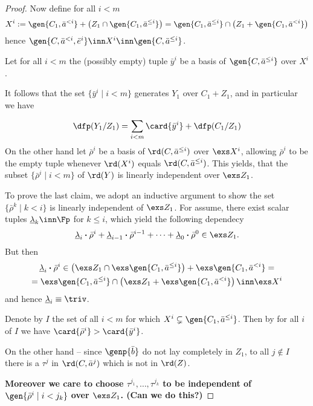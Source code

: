 \documentclass[11pt,english]{article}
\begin{document}
\begin{proof}
Now define for all $i<m$
$$X^{i}:=\gen{C_{1},\bar a^{<i}}+\left(Z_{1}\cap\gen{C_{1},\bar a^{\leq i}}\right)=\gen{C_{1},\bar a^{\leq i}}\cap\left( Z_{1}+\gen{C_{1},\bar a^{<i}}\right)$$
hence $\gen{C,\bar a^{<i},\bar e^{i}}\inn X^{i}\inn\gen{C,\bar a^{\leq i}}$.

\medskip
Let for all $i<m$ the (possibly empty) tuple $\bar y^{i}$ be a basis
of $\gen{{C,\bar a^{\leq i}}}$ over $X^{i}$.

It follows that the set $\{\bar y^{i}\mid i<m\}$ generates $Y_{1}$ over $C_{1}+Z_{1}$, and in particular we have

$$
\dfp(Y_{1}/Z_{1})=\sum_{i<m}\card{\bar y^{i}}+\dfp(C_{1}/Z_{1})
$$
On the other hand let $\bar\rho^{i}$ be a basis of $\rd(C,\bar a^{\leq i})$ over $\exs X^{i}$, allowing $\bar\rho^{i}$ to be the
empty tuple whenever $\rd(X^{i})$ equals $\rd(C,\bar a^{\leq i})$. This yields, that the subset
$\{\bar\rho^{i}\mid i<m\}$ of $\rd(Y)$ is linearly independent over $\exs Z_{1}$.

To prove the last claim, we adopt an inductive argument to show the set $\{\bar\rho^{k}\mid k<i\}$ is linearly independent of $\exs Z_{1}$.
For assume, there exist scalar tuples $\underline\lambda_{k}\inn\Fp$ for $k\leq i$, which yield the following dependecy
$$\underline\lambda_{i}\boldsymbol{\cdot}\bar\rho^{i}+\underline\lambda_{i-1}\boldsymbol{\cdot}\bar\rho^{i-1}+\cdots+\underline\lambda_{0}\boldsymbol{\cdot}\bar\rho^{0}\in\exs Z_{1}.$$
But then
\begin{multline}
\underline\lambda_{i}\boldsymbol{\cdot}\bar\rho^{i}\in\left(\exs Z_{1}\cap\exs\gen{C_{1},\bar a^{\leq i}}\right)+\exs\gen{C_{1},\bar a^{<i}}=\\
=\exs\gen{C_{1},\bar a^{\leq i}}\cap\left(\exs Z_{1}+\exs\gen{C_{1},\bar a^{<i}}\right)\inn\exs X^{i}
\end{multline}
and hence $\underline\lambda_{i}\equiv\triv$.

\medskip
Denote by $I$ the set of all $i<m$ for which $X^{i}\subsetneq\gen{C_{1},\bar a^{\leq i}}$. Then by 
for all $i$ of $I$ we have $\card{\bar\rho^{i}}>\card{\bar y^{i}}$.


On the other hand -- since $\genp{\bar b}$ do not lay completely in $Z_{1}$, to all $j\notin I$ there is a $\tau^{j}$ in $\rd(C,\bar a^{j})$ which is not in $\rd(Z)$.

{\bf Moreover we care to choose $\tau^{j_{1}},\dots,\tau^{j_{k}}$ to be independent of $\gen{\bar\rho^{i}\mid i<j_{k}}$ over $\exs Z_{1}$.
(Can we do this?)}


\end{proof}
\end{document}
